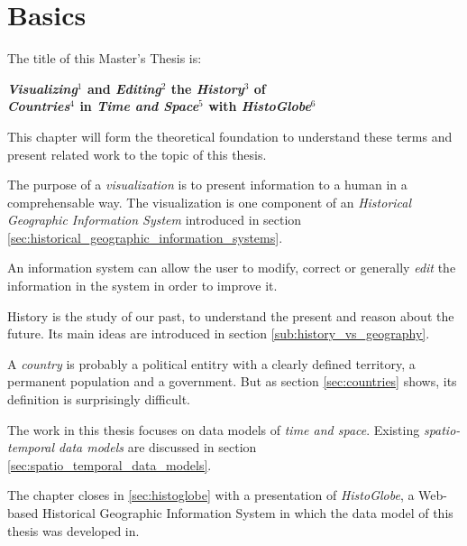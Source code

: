 
\chapter{Basics} %
\label{cha:basics}

The title of this Master's Thesis is:

\vspace{-1em}
\begin{large}
\begin{center}
  \textbf{
    \emph{Visualizing}$^1$ and \emph{Editing}$^2$ the \emph{History}$^3$ of\\
    \emph{Countries}$^4$ in \emph{Time and Space}$^5$ with \emph{HistoGlobe}$^6$
  }
\end{center}
\end{large}

This chapter will form the theoretical foundation to understand these terms and present related work to the topic of this thesis.

\begin{description}[labelindent=1.53em]
  \item[$^1$] The purpose of a \emph{visualization} is to present information to a human in a comprehensable way. The visualization is one component of an \emph{Historical Geographic Information System} introduced in section \ref{sec:historical_geographic_information_systems}.
  \item[$^2$] An information system can allow the user to modify, correct or generally \emph{edit} the information in the system in order to improve it.
  \item[$^3$] History is the study of our past, to understand the present and reason about the future. Its main ideas are introduced in section \ref{sub:history_vs_geography}.
  \item[$^4$] A \emph{country} is probably a political entitry with a clearly defined territory, a permanent population and a government. But as section \ref{sec:countries} shows, its definition is surprisingly difficult.
  \item[$^5$] The work in this thesis focuses on data models of \emph{time and space}. Existing \emph{spatio-temporal data models} are discussed in section \ref{sec:spatio_temporal_data_models}.
  \item[$^6$] The chapter closes in \ref{sec:histoglobe} with a presentation of \emph{HistoGlobe}, a Web-based Historical Geographic Information System in which the data model of this thesis was developed in.
\end{description}

